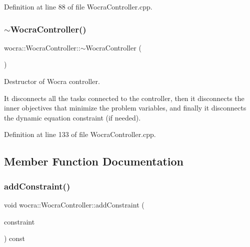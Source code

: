 Definition at line 88 of file Wocra\+Controller.\+cpp.

\hypertarget{classwocra_1_1WocraController_a4051d9aab485cfa444ed90da795f2bb2}{}\label{classwocra_1_1WocraController_a4051d9aab485cfa444ed90da795f2bb2} 
\subsubsection{\texorpdfstring{$\sim$\+Wocra\+Controller()}{~WocraController()}}
{\footnotesize\ttfamily wocra\+::\+Wocra\+Controller\+::$\sim$\+Wocra\+Controller (\begin{DoxyParamCaption}{ }\end{DoxyParamCaption})\hspace{0.3cm}{\ttfamily [virtual]}}

Destructor of Wocra controller.

It disconnects all the tasks connected to the controller, then it disconnects the inner objectives that minimize the problem variables, and finally it disconnects the dynamic equation constraint (if needed). 

Definition at line 133 of file Wocra\+Controller.\+cpp.



\subsection{Member Function Documentation}
\hypertarget{classwocra_1_1WocraController_a45b43039b1d950ba59d569f24b6e265d}{}\label{classwocra_1_1WocraController_a45b43039b1d950ba59d569f24b6e265d} 
\subsubsection{\texorpdfstring{add\+Constraint()}{addConstraint()}\hspace{0.1cm}{\footnotesize\ttfamily [1/2]}}
{\footnotesize\ttfamily void wocra\+::\+Wocra\+Controller\+::add\+Constraint (\begin{DoxyParamCaption}\item[{\hyperlink{namespaceocra_ae8b87cf4099be3efc3b410019ad2046e}{ocra\+::\+Linear\+Constraint} \&}]{constraint }\end{DoxyParamCaption}) const}

